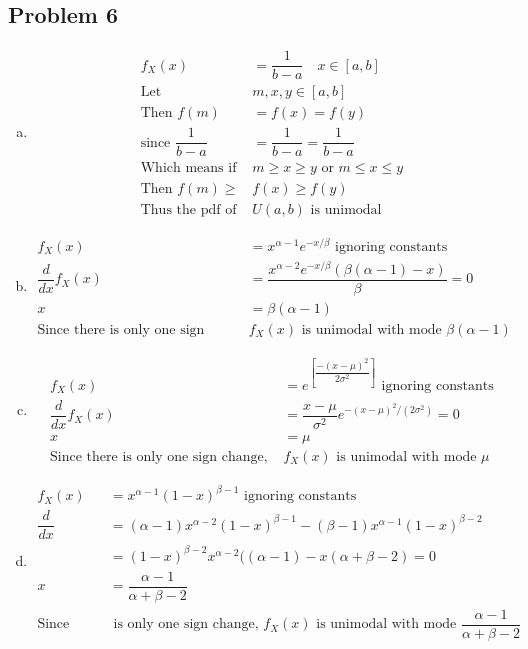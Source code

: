 \documentclass{article}
\begin{document}
\begin{flushleft}
\section*{Problem 6}
\begin{enumerate}[(a)]
\item 
\begin{align*}
f_X(x)&=\dfrac{1}{b-a} \quad x\in [a,b]\\
\text{Let } &m,x,y \in [a,b]\\
\text{Then } f(m)&=f(x)=f(y)\\
\text{since }\dfrac{1}{b-a}&=\dfrac{1}{b-a}=\dfrac{1}{b-a}\\
\text{Which means if }& m\geq  x \geq y \text{ or } m\leq x \leq y\\
\text{Then }f(m)\geq& f(x) \geq f(y)\\
\text{Thus the pdf of } &U(a,b) \text{ is unimodal}
\end{align*}
\item
\begin{align*}
f_X(x)&=x^{\alpha-1}e^{-x/\beta} \text{ ignoring constants }\\
\dfrac{d}{dx}f_X(x)&=\dfrac{x^{\alpha-2} e^{-x/\beta}(\beta(\alpha-1)-x)}{\beta}=0\\
x&=\beta(\alpha-1)\\
\text{Since there is only one sign change, } &f_X(x) \text{ is unimodal with mode } \beta(\alpha-1)
\end{align*}
\item 
\begin{align*}
f_X(x)&=e^{\left[\dfrac{-(x-\mu)^2}{2\sigma^2}\right]} \text{ ignoring constants}\\
\dfrac{d}{dx}f_X(x)&=\dfrac{x-\mu}{\sigma^2}e^{-(x-\mu)^2/(2\sigma^2)}=0\\
x&=\mu\\
\text{Since there is only one sign change, } &f_X(x) \text{ is unimodal with mode } \mu
\end{align*}
\item
\begin{align*}
f_X(x)&=x^{\alpha-1}(1-x)^{\beta-1} \text{ ignoring constants}\\
\dfrac{d}{dx}&=(\alpha-1)x^{\alpha-2}(1-x)^{\beta-1}-(\beta-1)x^{\alpha-1}(1-x)^{\beta-2}\\
&=(1-x)^{\beta-2}x^{\alpha-2}((\alpha-1)-x(\alpha+\beta-2)=0\\
x&=\dfrac{\alpha-1}{\alpha+\beta-2}\\
\text{Since there} &\text{ is only one sign change, } f_X(x) \text{ is unimodal with mode } \dfrac{\alpha-1}{\alpha+\beta-2}
\end{align*}
\end{enumerate}
\pagebreak

\end{flushleft}
\end{document}
